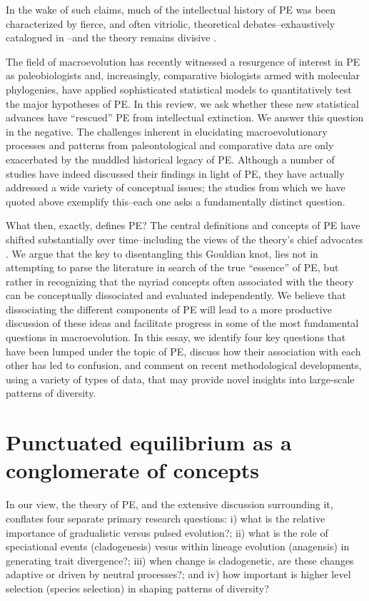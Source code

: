 In the wake of such claims, much of the intellectual history of PE was been characterized by fierce, and often vitriolic, theoretical debates--exhaustively catalogued in \citep{Levinton2001, Gould2002}--and the theory remains divisive \citep[for more on the history of the idea, see][]{Sepkoskibook}.

The field of macroevolution has recently witnessed a resurgence of interest in PE as paleobiologists and, increasingly, comparative biologists armed with molecular phylogenies, have applied sophisticated statistical models to quantitatively test the major hypotheses of PE. In this review, we ask whether these new statistical advances have ``rescued'' PE from intellectual extinction. We answer this question in the negative. The challenges inherent in elucidating macroevolutionary processes and patterns from paleontological and comparative data are only exacerbated by the muddled historical legacy of PE. Although a number of studies have indeed discussed their findings in light of PE, they have actually addressed a wide variety of conceptual issues; the studies from which we have quoted above exemplify this--each one asks a fundamentally distinct question.

What then, exactly, defines PE? The central definitions and concepts of PE have shifted substantially over time--including the views of the theory's chief advocates \citep{Mayr1982, Ruse1989, Sepkoskibook}. We argue that the key to disentangling this Gouldian knot, lies not in attempting to parse the literature in search of the true ``essence'' of PE, but rather in recognizing that the myriad concepts often associated with the theory can be conceptually dissociated and evaluated independently. We believe that dissociating the different components of PE will lead to a more productive discussion of these ideas and facilitate progress in some of the most fundamental questions in macroevolution. In this essay, we identify four key questions that have been lumped under the topic of PE, discuss how their association with each other has led to confusion, and comment on recent methodological developments, using a variety of types of data, that may provide novel insights into large-scale patterns of diversity.

\section{Punctuated equilibrium as a conglomerate of concepts}

In our view, the theory of PE, and the extensive discussion surrounding it, conflates four separate primary research questions: i) what is the relative importance of gradualistic versus pulsed evolution?; ii) what is the role of speciational events (cladogenesis) vesus within lineage evolution (anagensis) in generating trait divergence?; iii) when change is cladogenetic, are these changes adaptive or driven by neutral processes?; and iv) how important is higher level selection (species selection) in shaping patterns of diversity? 

